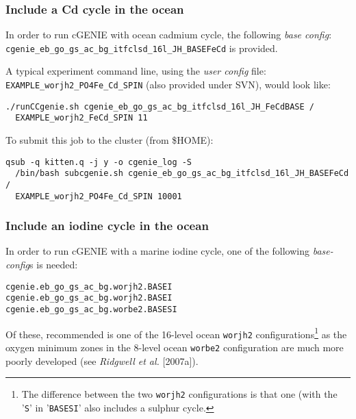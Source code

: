 \documentclass[11pt,fleqn]{book} %
\begin{document}
%
\subsubsection{Include a Cd cycle in the ocean}
\vspace{1mm}

In order to run cGENIE with ocean cadmium cycle, the following \textit{base config}: \\ 
\texttt{cgenie\_eb\_go\_gs\_ac\_bg\_itfclsd\_16l\_JH\_BASEFeCd} is provided.

A typical experiment command line, using the \textit{user config} file: \texttt{EXAMPLE\_worjh2\_PO4Fe\_Cd\_SPIN} (also provided under SVN), would look like:
\vspace{-4pt}\begin{verbatim}
./runCCgenie.sh cgenie_eb_go_gs_ac_bg_itfclsd_16l_JH_FeCdBASE /
  EXAMPLE_worjh2_FeCd_SPIN 11
\end{verbatim}\vspace{-4pt}

To submit this job to the cluster (from \$HOME):
\vspace{-4pt}\begin{verbatim}
qsub -q kitten.q -j y -o cgenie_log -S
  /bin/bash subcgenie.sh cgenie_eb_go_gs_ac_bg_itfclsd_16l_JH_BASEFeCd /
  EXAMPLE_worjh2_PO4Fe_Cd_SPIN 10001
\end{verbatim}\vspace{-4pt}

%
\subsubsection{Include an iodine cycle in the ocean}
\vspace{1mm}

In order to run cGENIE with a marine iodine cycle, one of the following \textit{base-config}s is needed:
\vspace{-1mm}\begin{verbatim}
cgenie.eb_go_gs_ac_bg.worjh2.BASEI
cgenie.eb_go_gs_ac_bg.worjh2.BASEI
cgenie.eb_go_gs_ac_bg.worbe2.BASESI
\end{verbatim}\vspace{-1mm}
Of these, recommended is one of the 16-level ocean \texttt{worjh2} configurations\footnote{The difference between the two \texttt{worjh2} configurations is that one (with the '\texttt{S}' in '\texttt{BASESI}' also includes a sulphur cycle.} as the oxygen minimum zones in the 8-level ocean \texttt{worbe2} configuration are much more poorly developed (see \textit{Ridgwell et al.} [2007a]).
\end{document}
